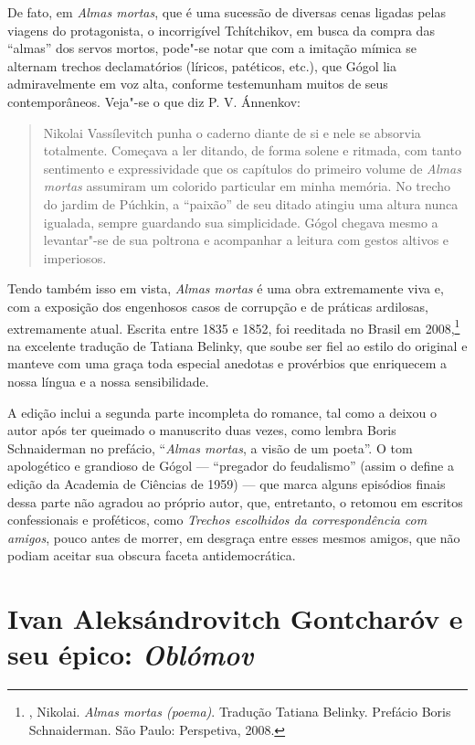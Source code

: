 De fato, em \emph{Almas mortas}, que é uma sucessão de diversas cenas ligadas pelas viagens do protagonista, o incorrigível Tchítchikov, em busca da compra das ``almas'' dos servos mortos, pode"-se notar que com a imitação mímica se alternam trechos declamatórios (líricos, patéticos, etc.), que Gógol lia admiravelmente em voz alta, conforme testemunham muitos de seus contemporâneos. Veja"-se o que diz P. V. Ánnenkov: 

\begin{quote}
Nikolai Vassílevitch punha o caderno diante de si e nele se absorvia totalmente. Começava a ler ditando, de forma solene e ritmada, com tanto sentimento e expressividade que os capítulos do primeiro volume de \emph{Almas mortas} assumiram um colorido particular em minha memória. No trecho do jardim de Púchkin, a ``paixão'' de seu ditado atingiu uma altura nunca igualada, sempre guardando sua simplicidade. Gógol chegava mesmo a levantar"-se de sua poltrona e acompanhar a leitura com gestos altivos e imperiosos. 
\end{quote}

Tendo também isso em vista, \emph{Almas mortas} é uma
obra extremamente viva e, com a exposição dos engenhosos casos de
corrupção e de práticas ardilosas, extremamente atual. Escrita entre
1835 e 1852, foi reeditada no Brasil em 2008,\footnote{, Nikolai. \emph{Almas mortas (poema)}. Tradução Tatiana Belinky. Prefácio Boris Schnaiderman. São Paulo: Perspetiva, 2008.} na excelente tradução de Tatiana Belinky, que soube ser fiel ao estilo do original e manteve com uma graça toda especial anedotas e provérbios que enriquecem a nossa língua e a nossa sensibilidade. 

A edição inclui a segunda parte incompleta do romance, tal como a deixou
o autor após ter queimado o manuscrito duas vezes, como lembra Boris Schnaiderman no prefácio, ``\emph{Almas mortas}, a visão de um poeta''. O tom apologético e grandioso de Gógol --- ``pregador do
feudalismo'' (assim o define a edição da Academia de Ciências de 1959) ---
que marca alguns episódios finais dessa parte não agradou ao próprio
autor, que, entretanto, o retomou em escritos confessionais e proféticos,
como \emph{Trechos escolhidos da correspondência com amigos}, pouco antes de
morrer, em desgraça entre esses mesmos amigos, que não podiam aceitar sua
obscura faceta antidemocrática. 



\chapter{Ivan Aleksándrovitch Gontcharóv e seu épico: \emph{Oblómov}}

